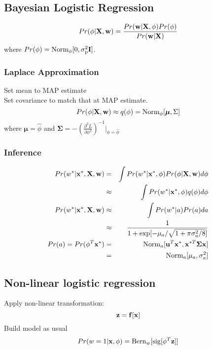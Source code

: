 \documentclass[12pt,a4paper]{article}
\begin{document}
\subsection*{Bayesian Logistic Regression}
$$
Pr(\phi|{\bf X,w}) =  \frac{Pr({\bf w|X},\phi)Pr(\phi)}{Pr({\bf w|X})}
$$
where $Pr(\phi) = {\rm Norm_{\phi}[0,\sigma_p^2{\bf I}]}$.
\subsubsection*{Laplace Approximation}
Set mean to MAP estimate \\
Set covariance to match that at MAP estimate.\\
$$
Pr(\phi|{\bf X,w}) \approx q(\phi) = {\rm Norm}_\phi[{\boldsymbol \mu, \Sigma}]
$$
where ${\boldsymbol \mu} = \hat\phi$ and $\boldsymbol \Sigma = -\left(\frac{\partial^2L}{\partial\phi^2}\right)^{-1}|_{\phi=\hat \phi}$\\
\subsubsection*{Inference}
\begin{eqnarray*}
Pr(w^*|{\bf x^*, X,w}) &=& \int Pr(w^*|{\bf x^*,\phi})Pr(\phi|{\bf X,w})d\phi\\
&\approx& \int Pr(w^*|{\bf x^*,\phi})q(\phi)d\phi \\
Pr(w^*|{\bf x^*,X,w}) &\approx& \int Pr(w^*|a)Pr(a)da\\
&\approx& \frac{1}{1+\exp[-\mu_a/\sqrt{1+\pi\sigma^2_a/8}]}\\
Pr(a) = Pr(\phi^T{\bf x}^*) &=& {\rm Norm} _a[{\bold u}^T{\bold x^*},{\bf x}^{*T}{\boldsymbol \Sigma}{\bf x}]\\
&=& {\rm Norm}_a[\mu_a,\sigma_a^2]
\end{eqnarray*}
\subsection*{Non-linear logistic regression}
Apply non-linear transformation:
$$
\bf z = f[x]
$$
Build model as usual
$$
Pr(w=1|{\bf x},\phi) = {\rm Bern}_w[{\rm sig}[\phi^T{\bf z}]]
$$
\end{document}
